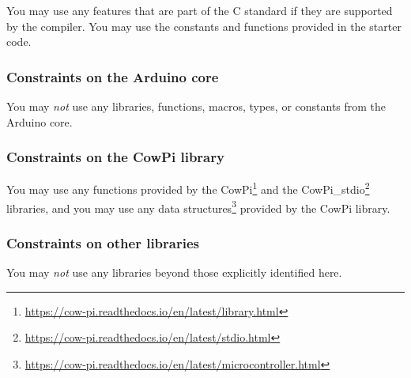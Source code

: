 You may use any features that are part of the C standard if they are supported by the compiler.
You may use the constants and functions provided in the starter code.

\subsubsection{Constraints on the Arduino core}

You may \textit{not} use any libraries, functions, macros, types, or constants from the Arduino core.

%


\subsubsection{Constraints on the CowPi library}

You may use any functions provided by the CowPi\footnote{
    \url{https://cow-pi.readthedocs.io/en/latest/library.html}
}
and the CowPi\_stdio\footnote{
    \url{https://cow-pi.readthedocs.io/en/latest/stdio.html}
} libraries,
and you may use any data structures\footnote{
    \url{https://cow-pi.readthedocs.io/en/latest/microcontroller.html}
} provided by the CowPi library.

\subsubsection{Constraints on other libraries}

You may \textit{not} use any libraries beyond those explicitly identified here.

